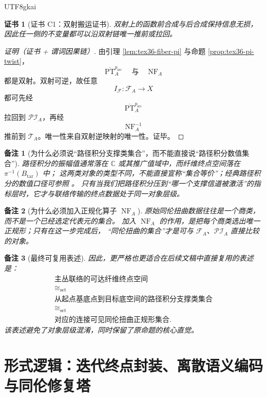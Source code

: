 \documentclass[12pt]{article}
\newtheorem{remark}{备注}[section]
\newtheorem{Certificate}{证书}[section]
\newcommand{\PT}{\operatorname{PT}}
\newcommand{\NF}{\operatorname{NF}}
\begin{document}
\begin{CJK*}{UTF8}{gkai}
\begin{Certificate}[证书 C1：双射搬运证书]
\label{cert:tex36-c1}
双射上的函数前合成与后合成保持信息无损，因此任一侧的不变量都可以沿双射链唯一推前或拉回。
\end{Certificate}

\begin{proof}[证明（证书 + 谓词因果链）]
由引理 \ref{lem:tex36-fiber-pi} 与命题 \ref{prop:tex36-pi-twist}，
\[
  \overline{\PT}_A^{p_{\mathrm{src}}}
  \quad\text{与}\quad
  \NF_A
\]
都是双射。双射可逆，故任意
\[
  I_{\mathcal{F}}:\mathcal{F}_A\to X
\]
都可先经
\[
  \overline{\PT}_A^{p_{\mathrm{src}}}
\]
拉回到 $\mathcal{PI}_A$，再经
\[
  \NF_A^{-1}
\]
推前到 $\mathcal{T}_A$。唯一性来自双射逆映射的唯一性。证毕。
\end{proof}

\begin{remark}[为什么必须说“路径积分支撑类集合”，而不能直接说“路径积分数值集合”]
路径积分的振幅值通常落在 $\mathbb{C}$ 或其推广值域中，而纤维终点空间落在 $\pi^{-1}(B_{\mathrm{tar}})$ 中；
这两类对象的类型不同，不能直接宣称“集合等价”；经典路径积分的数值口径可参照 \cite{FeynmanHibbs1965QMPI,Schulman2005Technique}。
只有当我们把路径积分压到“哪一个支撑信道被激活”的指标层时，它才与联络传输的终点数据处于同一对象层级。
\end{remark}

\begin{remark}[为什么必须加入正规化算子 $\NF_A$]
原始同伦扭曲数据往往是一个商类，而不是一个已经选定代表元的集合。
加入 $\NF_A$ 的作用，是把每个商类选出唯一正规形；只有在这一步完成后，
“同伦扭曲的集合”才是可与 $\mathcal{F}_A$、$\mathcal{PI}_A$ 直接比较的对象。
\end{remark}

\begin{remark}[最终可复用表述]
因此，更严格也更适合在后续文稿中直接复用的表述是：
\[
  \begin{gathered}
    \text{主丛联络的可达纤维终点空间}\\
    \cong_{\mathrm{set}}\\
    \text{从起点基底点到目标底空间的路径积分支撑类集合}\\
    \cong_{\mathrm{set}}\\
    \text{对应的连接可见同伦扭曲正规形集合}.
  \end{gathered}
\]
该表述避免了对象层级混淆，同时保留了原命题的核心直觉。
\end{remark}

\section{形式逻辑：迭代终点封装、离散语义编码与同伦修复塔}
\label{sec:tex36-ch2}


\end{CJK*}
\end{document}
